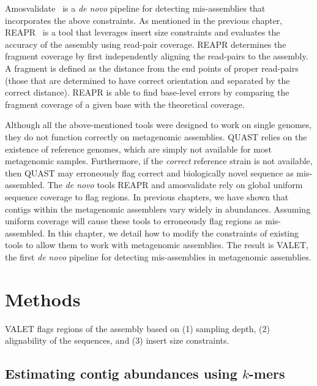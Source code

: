 Amosvalidate~\cite{amosvalidate2008} is a \emph{de novo} pipeline for detecting mis-assemblies that incorporates the above constraints.
As mentioned in the previous chapter, REAPR~\cite{hunt2013reapr} is a tool that leverages insert size constraints and evaluates the accuracy of the assembly using read-pair coverage.
REAPR determines the fragment coverage by first independently aligning the read-pairs to the assembly.
A fragment is defined as the distance from the end points of proper read-pairs (those that are determined to have correct orientation and separated by the correct distance).
REAPR is able to find base-level errors by comparing the fragment coverage of a given base with the theoretical coverage.

Although all the above-mentioned tools were designed to work on single genomes, they do not function correctly on metagenomic assemblies.
QUAST relies on the existence of reference genomes, which are simply not available for most metagenomic samples.
Furthermore, if the \emph{correct} reference strain is not available, then QUAST may erroneously flag correct and biologically novel sequence as mis-assembled.
The \emph{de novo} tools REAPR and amosvalidate rely on global uniform sequence coverage to flag regions.
In previous chapters, we have shown that contigs within the metagenomic assemblers vary widely in abundances.
Assuming uniform coverage will cause these tools to erroneously flag regions as mis-assembled.
In this chapter, we detail how to modify the constraints of existing tools to allow them to work with metagenomic assemblies.
The result is VALET, the first \emph{de novo} pipeline for detecting mis-assemblies in metagenomic assemblies.

\section{Methods}
VALET flags regions of the assembly based on (1) sampling depth, (2) alignability of the sequences, and (3) insert size constraints.

\subsection{Estimating contig abundances using $k$-mers}

